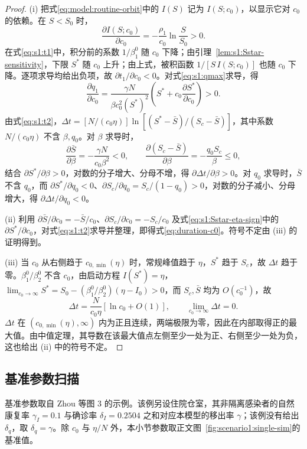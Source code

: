 \label{sec:proof:contact-effects}
\begin{proof}
(i) 把式\eqref{eq:model:routine-orbit}中的 $I(S)$ 记为 $I(S;c_0)$，以显示它对 $c_0$ 的依赖。在 $S<S_0$ 时，
\[
\frac{\partial I(S;c_0)}{\partial c_0}=-\frac{\rho_1}{c_0}\ln\frac{S}{S_0}>0.
\]
在式\eqref{eq:s1:t1}中，积分前的系数 $1/\beta_1^0$ 随 $c_0$ 下降；由引理~\ref{lem:s1:Sstar-sensitivity}，下限 $S^*$ 随 $c_0$ 上升；由上式，被积函数 $1/[S\,I(S;c_0)]$ 也随 $c_0$ 下降。逐项求导均给出负项，故 $\partial t_1/\partial c_0<0$。对式\eqref{eq:s1:qmax}求导，得
\[
\frac{\partial q_1}{\partial c_0}
=\frac{\gamma N}{\beta c_0^2(S^*)^2}
\left(S^*+c_0\frac{\partial S^*}{\partial c_0}\right)>0.
\]
由式\eqref{eq:s1:t2}，$\Delta t=[N/(c_0\eta)]\ln[(S^*-\bar S)/(S_c-\bar S)]$，其中系数 $N/(c_0\eta)$ 不含 $\beta,q_0$。对 $\beta$ 求导时，
\[
\frac{\partial\bar S}{\partial\beta}=-\frac{\gamma N}{c_0\beta^2}<0,
\qquad
\frac{\partial(S_c-\bar S)}{\partial\beta}=-\frac{q_0S_c}{\beta}\le0,
\]
结合 $\partial S^*/\partial\beta>0$，对数的分子增大、分母不增，得 $\partial\Delta t/\partial\beta>0$。对 $q_0$ 求导时，$\bar S$ 不含 $q_0$，而 $\partial S^*/\partial q_0<0$、$\partial S_c/\partial q_0=S_c/(1-q_0)>0$，对数的分子减小、分母增大，得 $\partial\Delta t/\partial q_0<0$。

(ii) 利用 $\partial\bar S/\partial c_0=-\bar S/c_0$、$\partial S_c/\partial c_0=-S_c/c_0$ 及式\eqref{eq:s1:Sstar-eta-sign}中的 $\partial S^*/\partial c_0$，对式\eqref{eq:s1:t2}求导并整理，即得式\eqref{eq:duration-c0}。符号不定由 (iii) 的证明得到。

(iii) 当 $c_0$ 从右侧趋于 $c_{0,\min}(\eta)$ 时，常规峰值趋于 $\eta$，$S^*$ 趋于 $S_c$，故 $\Delta t$ 趋于零。$\beta_1^0/\beta_2^0$ 不含 $c_0$，由启动方程 $I(S^*)=\eta$，
$\lim_{c_0\to\infty}S^*=S_0-(\beta_1^0/\beta_2^0)(\eta-I_0)>0$，而 $S_c,\bar S$ 均为 $O(c_0^{-1})$，故
\[
\Delta t=\frac{N}{c_0\eta}[\ln c_0+O(1)],\qquad
\lim_{c_0\to\infty}\Delta t=0.
\]
$\Delta t$ 在 $(c_{0,\min}(\eta),\infty)$ 内为正且连续，两端极限为零，因此在内部取得正的最大值。由中值定理，其导数在该最大值点左侧至少一处为正、右侧至少一处为负，这也给出 (ii) 中的符号不定。
\end{proof}

\FloatBarrier
\subsection{基准参数扫描}
\label{sec:sup:baseline-scan}
基准参数取自 Zhou 等\cite{Zhou2024SPCI}图 3 的示例。该例另设住院仓室，其非隔离感染者的自然康复率 $\gamma_I=0.1$ 与确诊率 $\delta_I=0.2504$ 之和对应本模型的移出率 $\gamma$；该例没有给出 $\delta_q$，取 $\delta_q=\gamma$。除 $c_0$ 与 $\eta/N$ 外，本小节参数取正文图~\ref{fig:scenario1:single-sim}的基准值。

